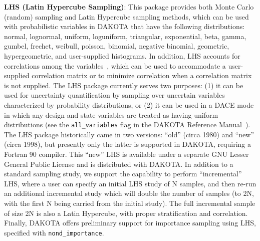 \textbf{LHS (Latin Hypercube Sampling)}: This package provides both
Monte Carlo (random) sampling and Latin Hypercube sampling methods,
which can be used with probabilistic variables in DAKOTA that have the
following distributions: normal, lognormal, uniform, loguniform,
triangular, exponential, beta, gamma, gumbel, frechet, weibull, poisson, 
binomial, negative binomial, geometric, hypergeometric, and
user-supplied histograms. In addition, LHS accounts for correlations
among the variables~\cite{Ima84}, which can be used to accommodate a
user-supplied correlation matrix or to minimize correlation when a
correlation matrix is not supplied. The LHS package currently serves
two purposes: (1) it can be used for uncertainty quantification by
sampling over uncertain variables characterized by probability
distributions, or (2) it can be used in a DACE mode in which any
design and state variables are treated as having uniform distributions
(see the \texttt{all\_variables} flag in the DAKOTA Reference
Manual~\cite{RefMan}). The LHS package historically came in two
versions: ``old'' (circa 1980) and ``new'' (circa 1998), but presently
only the latter is supported in DAKOTA, requiring a Fortran 90
compiler.  This ``new'' LHS is available under a separate GNU Lesser
General Public License and is distributed with DAKOTA.  In addition 
to a standard sampling study, we support the capability to perform 
``incremental'' LHS, where a user can specify an initial LHS study 
of N samples, and then re-run an additional incremental study which 
will double the number of samples (to 2N, with the first N being 
carried from the initial study).  The full incremental sample of 
size 2N is also a Latin Hypercube, with proper stratification and 
correlation.  Finally, DAKOTA offers preliminary support for 
importance sampling using LHS, specified with \texttt{nond\_importance}.

